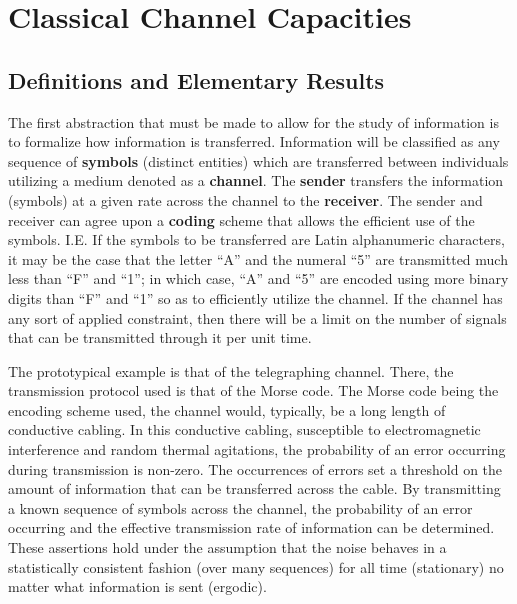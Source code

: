 \documentclass[letterpaper,twoside,10pt]{article}
\begin{document}
\section{Classical Channel Capacities}

\subsection{Definitions and Elementary Results}
The first abstraction that must be made to allow for the study of information is to formalize how information is transferred. Information will be classified as any sequence of \textbf{symbols} (distinct entities) which are transferred between individuals utilizing a medium denoted as a \textbf{channel}. The \textbf{sender} transfers the information (symbols) at a given rate across the channel to the \textbf{receiver}. The sender and receiver can agree upon a \textbf{coding} scheme that allows the efficient use of the symbols. I.E. If the symbols to be transferred are Latin alphanumeric characters, it may be the case that the letter ``A'' and the numeral ``5'' are transmitted much less than ``F'' and ``1''; in which case, ``A'' and ``5'' are encoded using more binary digits than ``F'' and ``1'' so as to efficiently utilize the channel. If the channel has any sort of applied constraint, then there will be a limit on the number of signals that can be transmitted through it per unit time.

The prototypical example is that of the telegraphing channel. There, the transmission protocol used is that of the Morse code. The Morse code being the encoding scheme used, the channel would, typically, be a long length of conductive cabling. In this conductive cabling, susceptible to electromagnetic interference and random thermal agitations, the probability of an error occurring during transmission is non-zero. The occurrences of errors set a threshold on the amount of information that can be transferred across the cable. By transmitting a known sequence of symbols across the channel, the probability of an error occurring and the effective transmission rate of information can be determined. These assertions hold under the assumption that the noise behaves in a statistically consistent fashion (over many sequences) for all time (stationary) no matter what information is sent (ergodic).
\end{document}
